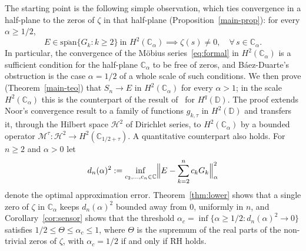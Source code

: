 \documentclass[11pt]{extarticle}
\numberwithin{equation}{section}
\theoremstyle{plain}
\theoremstyle{remark}
\begin{document}
The starting point is the following simple observation, which ties convergence in
a half-plane to the zeros of $\zeta$ in that half-plane
(Proposition~\ref{main-prop}): for every $\alpha \geq 1/2$,
\[
E \in \overline{\mathrm{span}}\{G_k : k \geq 2\} \ \text{in }
H^2(\mathbb{C}_\alpha) \implies \zeta(s) \neq 0, \quad \forall\, s \in \mathbb{C}_\alpha .
\]
In particular, the convergence of the M\"obius series~\eqref{eq:formal} in
$H^2(\mathbb{C}_\alpha)$ is a sufficient condition for the half-plane
$\mathbb{C}_\alpha$ to be free of zeros, and Báez-Duarte's obstruction is the case
$\alpha = 1/2$ of a whole scale of such conditions. We then prove
(Theorem~\ref{main-teo}) that $S_n \to E$ in $H^2(\mathbb{C}_\alpha)$ for every
$\alpha > 1$; in the scale $H^2(\mathbb{C}_\alpha)$ this is the counterpart of the
result of~\cite{noor-charles} for $H^q(\mathbb{D})$. The proof extends Noor's
convergence result to a family of functions $g_{k,\tau}$ in $H^2(\mathbb{D})$ and
transfers it, through the Hilbert space $\mathcal{H}^2$ of Dirichlet series, to
$H^2(\mathbb{C}_\alpha)$ by a bounded operator
$\mathcal{M}^\tau : \mathcal{H}^2 \to H^2(\mathbb{C}_{1/2+\tau})$. A
quantitative counterpart also holds. For $n \geq 2$ and $\alpha > 0$ let
\[
d_n(\alpha)^2 := \inf_{c_2, \dots, c_n \in \mathbb{C}}
\Bigl\| E - \sum_{k=2}^{n} c_k G_k \Bigr\|^2_\alpha
\]
denote the optimal approximation error. Theorem~\ref{thm:lower} shows that a single
zero of $\zeta$ in $\mathbb{C}_\alpha$ keeps $d_n(\alpha)^2$ bounded away from $0$,
uniformly in $n$, and Corollary~\ref{cor:sensor} shows that the threshold
$\alpha_c = \inf\{\alpha \geq 1/2 : d_n(\alpha)^2 \to 0\}$ satisfies
$1/2 \leq \Theta \leq \alpha_c \leq 1$, where $\Theta$ is the supremum of the real
parts of the non-trivial zeros of $\zeta$, with $\alpha_c = 1/2$ if and only if RH holds.
\end{document}
